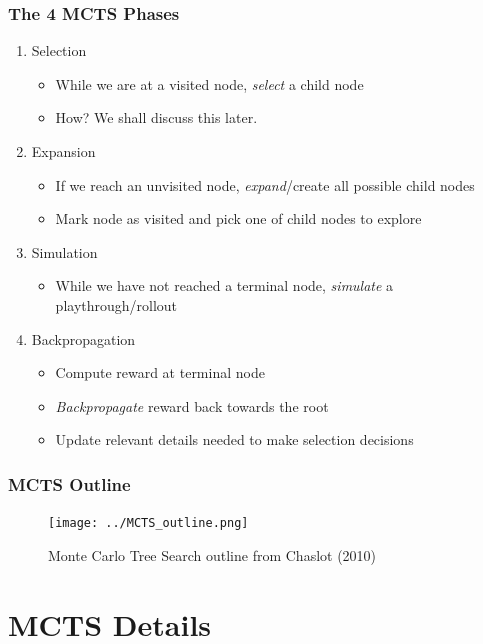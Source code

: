 \documentclass{beamer}
\begin{document}
  \begin{frame}
    \frametitle{The 4 MCTS Phases}
    \begin{enumerate}
        \item<1-5> Selection
        \begin{itemize}
          \item<1> While we are at a visited node, \textit{select} a child node
          \item<1> How? We shall discuss this later.
        \end{itemize}
        \item<2-5> Expansion
        \begin{itemize}
          \item<2> If we reach an unvisited node, \textit{expand}/create all possible child nodes
          \item<2> Mark node as visited and pick one of child nodes to explore
        \end{itemize}
        \item<3-5> Simulation
        \begin{itemize}
          \item<3> While we have not reached a terminal node, \textit{simulate} a playthrough/rollout
        \end{itemize}
        \item<4-5> Backpropagation
        \begin{itemize}
          \item<4> Compute reward at terminal node
          \item<4> \textit{Backpropagate} reward back towards the root
          \item<4> Update relevant details needed to make selection decisions
        \end{itemize}
    \end{enumerate}
  \end{frame}

  \begin{frame}
    \frametitle{MCTS Outline}
    \begin{figure}
        \texttt{[image: ../MCTS\_outline.png]}
        \caption{Monte Carlo Tree Search outline from Chaslot (2010)}
    \end{figure}
  \end{frame}
  
  \section{MCTS Details}
  
\end{document}
